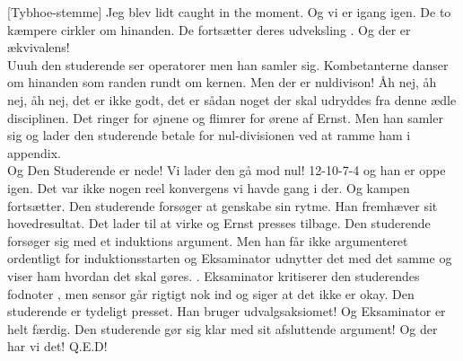 \documentclass[a4paper,11pt]{article}
\begin{document}
\begin{sketch}
[Tybhoe-stemme] Jeg blev lidt caught in the moment. %
Og vi er igang igen. De to kæmpere cirkler om hinanden.  De fortsætter deres udveksling . Og der er ækvivalens!  \\
Uuuh den studerende ser operatorer  men han samler sig.
Kombetanterne danser om hinanden som randen rundt om kernen. Men der er nuldivison!   Åh nej, åh nej, åh nej, det er ikke godt, det er sådan noget der skal udryddes fra denne ædle disciplinen. Det ringer for øjnene og flimrer for ørene af Ernst. Men han samler sig og lader den studerende betale for nul-divisionen ved at ramme ham i appendix.  \\
Og Den Studerende er nede! Vi lader den gå mod nul! 12-10-7-4 og han er oppe igen. Det var ikke nogen reel konvergens vi havde gang i der.  Og kampen fortsætter. Den studerende forsøger at genskabe sin rytme. Han fremhæver sit hovedresultat. \act{} Det lader til at virke og Ernst presses tilbage. Den studerende forsøger sig med et induktions argument. Men han får ikke argumenteret ordentligt for induktionsstarten  og Eksaminator udnytter det med det samme og viser ham hvordan det skal gøres. . Eksaminator kritiserer den studerendes fodnoter , men sensor går rigtigt nok ind og siger at det ikke er okay.
Den studerende er tydeligt presset. Han bruger udvalgsaksiomet!  Og Eksaminator er helt færdig. Den studerende gør sig klar med sit afsluttende argument! Og der har vi det! Q.E.D!  

\end{sketch}
\end{document}

